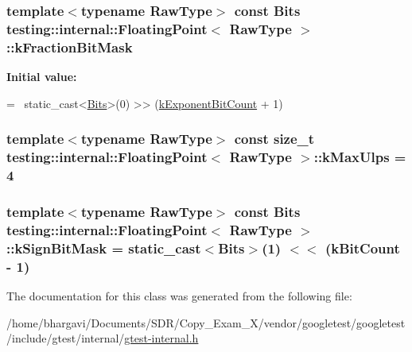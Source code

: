 \subsubsection[{\texorpdfstring{k\+Fraction\+Bit\+Mask}{kFractionBitMask}}]{\setlength{\rightskip}{0pt plus 5cm}template$<$typename Raw\+Type$>$ const {\bf Bits} {\bf testing\+::internal\+::\+Floating\+Point}$<$ Raw\+Type $>$\+::k\+Fraction\+Bit\+Mask\hspace{0.3cm}{\ttfamily [static]}}\hypertarget{classtesting_1_1internal_1_1_floating_point_a0ac75d4ffd24f14bca452abe8a718da1}{}\label{classtesting_1_1internal_1_1_floating_point_a0ac75d4ffd24f14bca452abe8a718da1}
{\bfseries Initial value\+:}
\begin{DoxyCode}
=
    ~static\_cast<\hyperlink{classtesting_1_1internal_1_1_floating_point_abf228bf6cd48f12c8b44c85b4971a731}{Bits}>(0) >> (\hyperlink{classtesting_1_1internal_1_1_floating_point_a1973d843c00781053d3073daa8a40119}{kExponentBitCount} + 1)
\end{DoxyCode}
\subsubsection[{\texorpdfstring{k\+Max\+Ulps}{kMaxUlps}}]{\setlength{\rightskip}{0pt plus 5cm}template$<$typename Raw\+Type$>$ const size\+\_\+t {\bf testing\+::internal\+::\+Floating\+Point}$<$ Raw\+Type $>$\+::k\+Max\+Ulps = 4\hspace{0.3cm}{\ttfamily [static]}}\hypertarget{classtesting_1_1internal_1_1_floating_point_aac498b3714d93f8e88cdc30e4c5935f6}{}\label{classtesting_1_1internal_1_1_floating_point_aac498b3714d93f8e88cdc30e4c5935f6}
\subsubsection[{\texorpdfstring{k\+Sign\+Bit\+Mask}{kSignBitMask}}]{\setlength{\rightskip}{0pt plus 5cm}template$<$typename Raw\+Type$>$ const {\bf Bits} {\bf testing\+::internal\+::\+Floating\+Point}$<$ Raw\+Type $>$\+::k\+Sign\+Bit\+Mask = static\+\_\+cast$<${\bf Bits}$>$(1) $<$$<$ ({\bf k\+Bit\+Count} -\/ 1)\hspace{0.3cm}{\ttfamily [static]}}\hypertarget{classtesting_1_1internal_1_1_floating_point_aca98b5ea6f2222a66a82e52421682efa}{}\label{classtesting_1_1internal_1_1_floating_point_aca98b5ea6f2222a66a82e52421682efa}


The documentation for this class was generated from the following file\+:\begin{DoxyCompactItemize}
\item 
/home/bhargavi/\+Documents/\+S\+D\+R/\+Copy\+\_\+\+Exam\+\_\+X/vendor/googletest/googletest/include/gtest/internal/\hyperlink{gtest-internal_8h}{gtest-\/internal.\+h}\end{DoxyCompactItemize}
